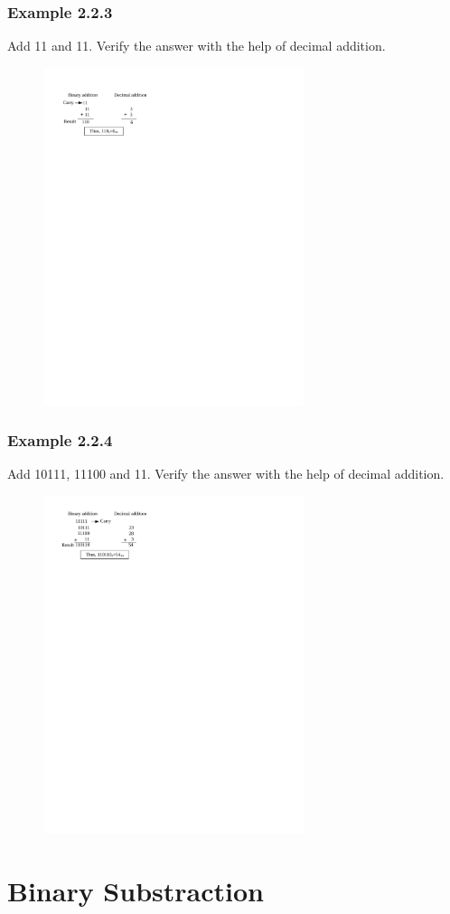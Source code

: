 \documentclass{beamer}
\begin{document}
\frame
{\frametitle {Example 2.2.3}
Add 11 and 11. Verify the answer with the help of decimal addition.
\begin{figure}[!ht]
\centering
\includegraphics[width=3in]{223}
\end{figure}
}

\frame
{\frametitle {Example 2.2.4}
Add 10111, 11100 and 11. Verify the answer with the help of decimal addition.
\begin{figure}[!ht]
\centering
\includegraphics[width=3in]{224}
\end{figure}
}


\section{Binary Substraction}
\end{document}
